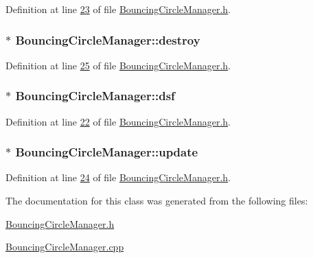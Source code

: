 Definition at line \hyperlink{_bouncing_circle_manager_8h_source_l00023}{23} of file \hyperlink{_bouncing_circle_manager_8h_source}{Bouncing\+Circle\+Manager.\+h}.

\hypertarget{class_bouncing_circle_manager_aee82e3ddd983f4e27c439b74494ab3d5}{}
\subsubsection[{destroy}]{$\ast$ Bouncing\+Circle\+Manager\+::destroy}\label{class_bouncing_circle_manager_aee82e3ddd983f4e27c439b74494ab3d5}


Definition at line \hyperlink{_bouncing_circle_manager_8h_source_l00025}{25} of file \hyperlink{_bouncing_circle_manager_8h_source}{Bouncing\+Circle\+Manager.\+h}.

\hypertarget{class_bouncing_circle_manager_a4c48cd67fe5ff21396b9e5552d2159a1}{}
\subsubsection[{dsf}]{$\ast$ Bouncing\+Circle\+Manager\+::dsf}\label{class_bouncing_circle_manager_a4c48cd67fe5ff21396b9e5552d2159a1}


Definition at line \hyperlink{_bouncing_circle_manager_8h_source_l00022}{22} of file \hyperlink{_bouncing_circle_manager_8h_source}{Bouncing\+Circle\+Manager.\+h}.

\hypertarget{class_bouncing_circle_manager_a40c60a1170ab1528bf67c86bcc2d7637}{}
\subsubsection[{update}]{$\ast$ Bouncing\+Circle\+Manager\+::update}\label{class_bouncing_circle_manager_a40c60a1170ab1528bf67c86bcc2d7637}


Definition at line \hyperlink{_bouncing_circle_manager_8h_source_l00024}{24} of file \hyperlink{_bouncing_circle_manager_8h_source}{Bouncing\+Circle\+Manager.\+h}.



The documentation for this class was generated from the following files\+:\begin{DoxyCompactItemize}
\item 
\hyperlink{_bouncing_circle_manager_8h}{Bouncing\+Circle\+Manager.\+h}\item 
\hyperlink{_bouncing_circle_manager_8cpp}{Bouncing\+Circle\+Manager.\+cpp}\end{DoxyCompactItemize}
